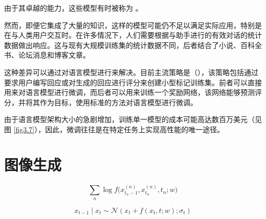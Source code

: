 由于其卓越的能力，这些模型有时被称为 \citep{arxiv-2108.07258}。

然而，即便它集成了大量的知识，这样的模型可能仍不足以满足实际应用，特别是在与人类用户交互时。在许多情况下，人们需要根据与助手进行的有效对话的统计数据做出响应。这与现有大规模训练集的统计数据不同，后者结合了小说、百科全书、论坛消息和博客文章。

这种差异可以通过对语言模型进行来解决。目前主流策略是（）\citep{arxiv-2203.02155}，该策略包括通过要求用户编写回应或对生成的回应进行评分来创建小型标记训练集。前者可以直接用来对语言模型进行微调，而后者可以用来训练一个奖励网络，该网络能够预测评分，并将其作为目标，使用标准的方法对语言模型进行微调。

由于语言模型架构大小的急剧增加，训练单一模型的成本可能高达数百万美元（见图 \ref{fig3.7}），因此，微调往往是在特定任务上实现高性能的唯一途径。

\section{图像生成}\label{sec7.2}

\[\sum_{n} \log f\Big(x_{t_n-1}^{(n)}, x_{t_n}^{(n)}, t_n; w\Big)\]

\begin{equation}
    x_{t-1} \mid x_t \sim \mathcal{N} (x_t + f(x_t,t;w);\sigma_t) \label{eq7.1}
\end{equation}

